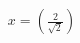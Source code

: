 \documentclass[preview]{standalone}
\begin{document}
\begin{align*}
x = \left(\frac{2}{\sqrt{2}}\right)
\end{align*}
\end{document}
